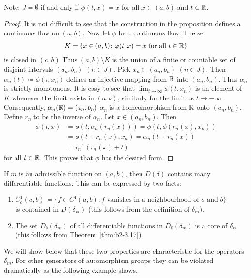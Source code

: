 Note: $J = \emptyset$ if and only if\/ $\phi(t,x) = x$ for all $x \in (a,b)$ and $t \in \mathbb{R}$.
\begin{proof}
It is not difficult to see that the construction in the proposition defines a continuous flow on $(a,b)$.
Now let $\phi$ be a continuous flow.
The set 
\[
K = \{ x \in (a,b) \colon \phi(t,x) = x \text{ for all } t \in \R \} 
\]
is closed in $(a,b)$
Thus $(a,b) \setminus K$ is the union of a finite or countable set of disjoint intervals $(a_{n},b_{n})$ $(n \in J)$.
Pick $x_{n} \in (a_{n},b_{n})$ $(n \in J)$.
Then $\alpha_{n}(t) \coloneq \phi(t,x_{n})$ defines an injective mapping from $\mathbb{R}$ into $(a_{n},b_{n})$.
Thus $\alpha_{n}$ is strictly monotonous.
It is easy to see that $\lim_{t \to \infty} \phi(t,x_{n})$ is an element of\/ $K$ whenever the limit exists in $(a,b)$; similarly for the limit as $t \to -\infty$.
Consequently, $\alpha_{n}(\mathbb{R}) = (a_{n},b_{n})$ \ie  $\alpha_{n}$ is a homeomorphism from $\mathbb{R}$ onto $(a_{n},b_{n})$.
Define $r_{n}$ to be the inverse of\/ $\alpha_{n}$.
Let $x \in (a_{n},b_{n})$.
Then 
\begin{align*}
\phi(t,x) &= \phi(t, \alpha_{n}(r_{n}(x))) = \phi(t, \phi(r_{n}(x),x_{n})) \\
          &= \phi(t + r_{n}(x),x_{n}) = \alpha_{n}(t + r_{n}(x)) \\
          &= r_{n}^{-1}(r_{n}(x) + t)	
\end{align*}
for all $t \in \mathbb{R}$.
This proves that $\phi$ has the desired form.
\end{proof}
If\/ $m$ is an admissible function on $(a,b)$, then $D(\delta)$ contains many differentiable functions.
This can be expressed by two facts:
\begin{enumerate}[\upshape (i)]
\item \label{enum:b2-3-1.1}
$C_{c}^{1}(a,b) \coloneq \{ f \in C^{1}(a,b) \colon f \text{ vanishes in a neighbourhood of } a \text{ and } b\}$
\\is contained in $D(\delta_{m})$ (this follows from the definition of\/ $\delta_{m}$).

\item  \label{enum:b2-3-1.2}
The set $D_{0}(\delta_{m})$ of all differentiable functions in $D_{0}(\delta_{m})$ is a core of\/ $\delta_{m}$\\ (this follows from Theorem~\ref{thm:b2-3.17}).
\end{enumerate}
We will show below that these two properties are characteristic for the operators $\delta_{m}$.
For other generators of automorphism groups they can be violated dramatically as the following example shows.
